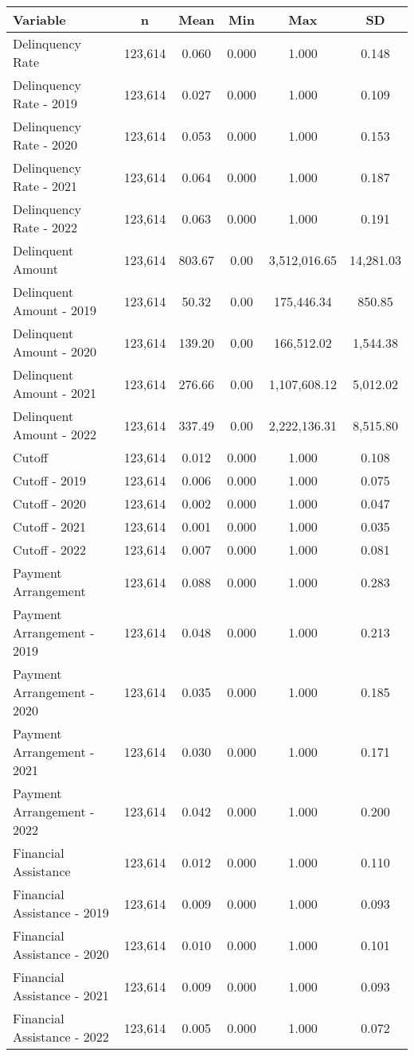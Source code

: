 \begin{tabular}{l|c|c|c|c|c}
\toprule 
\midrule 
Variable & n & Mean & Min & Max & SD \\
\midrule 
Delinquency Rate & 123,614 & 0.060 & 0.000 & 1.000 & 0.148 \\
\quad Delinquency Rate - 2019 & 123,614 & 0.027 & 0.000 & 1.000 & 0.109 \\
\quad Delinquency Rate - 2020 & 123,614 & 0.053 & 0.000 & 1.000 & 0.153 \\
\quad Delinquency Rate - 2021 & 123,614 & 0.064 & 0.000 & 1.000 & 0.187 \\
\quad Delinquency Rate - 2022 & 123,614 & 0.063 & 0.000 & 1.000 & 0.191 \\
\midrule 
Delinquent Amount & 123,614 & 803.67 & 0.00 & 3,512,016.65 & 14,281.03 \\
\quad Delinquent Amount - 2019 & 123,614 & 50.32 & 0.00 & 175,446.34 & 850.85 \\
\quad Delinquent Amount - 2020 & 123,614 & 139.20 & 0.00 & 166,512.02 & 1,544.38 \\
\quad Delinquent Amount - 2021 & 123,614 & 276.66 & 0.00 & 1,107,608.12 & 5,012.02 \\
\quad Delinquent Amount - 2022 & 123,614 & 337.49 & 0.00 & 2,222,136.31 & 8,515.80 \\
\midrule 
Cutoff & 123,614 & 0.012 & 0.000 & 1.000 & 0.108 \\
\quad Cutoff - 2019 & 123,614 & 0.006 & 0.000 & 1.000 & 0.075 \\
\quad Cutoff - 2020 & 123,614 & 0.002 & 0.000 & 1.000 & 0.047 \\
\quad Cutoff - 2021 & 123,614 & 0.001 & 0.000 & 1.000 & 0.035 \\
\quad Cutoff - 2022 & 123,614 & 0.007 & 0.000 & 1.000 & 0.081 \\
\midrule 
Payment Arrangement & 123,614 & 0.088 & 0.000 & 1.000 & 0.283 \\
\quad Payment Arrangement - 2019 & 123,614 & 0.048 & 0.000 & 1.000 & 0.213 \\
\quad Payment Arrangement - 2020 & 123,614 & 0.035 & 0.000 & 1.000 & 0.185 \\
\quad Payment Arrangement - 2021 & 123,614 & 0.030 & 0.000 & 1.000 & 0.171 \\
\quad Payment Arrangement - 2022 & 123,614 & 0.042 & 0.000 & 1.000 & 0.200 \\
\midrule 
Financial Assistance & 123,614 & 0.012 & 0.000 & 1.000 & 0.110 \\
\quad Financial Assistance - 2019 & 123,614 & 0.009 & 0.000 & 1.000 & 0.093 \\
\quad Financial Assistance - 2020 & 123,614 & 0.010 & 0.000 & 1.000 & 0.101 \\
\quad Financial Assistance - 2021 & 123,614 & 0.009 & 0.000 & 1.000 & 0.093 \\
\quad Financial Assistance - 2022 & 123,614 & 0.005 & 0.000 & 1.000 & 0.072 \\
\midrule 
\bottomrule 
\end{tabular}
